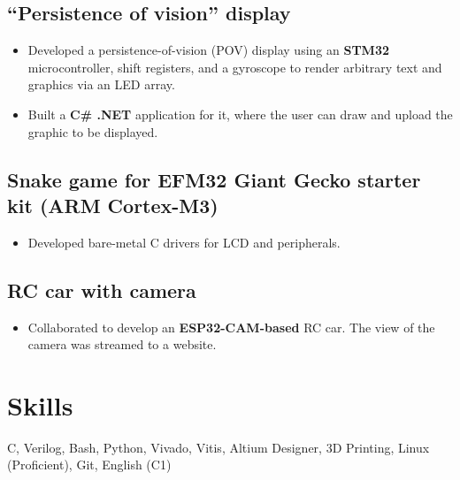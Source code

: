 \documentclass{article}
\begin{document}
\subsection{\enquote{Persistence of vision} display}
\begin{itemize}
  \item Developed a persistence-of-vision (POV) display using an \textbf{STM32} microcontroller, shift registers, and a gyroscope to render arbitrary text and graphics via an LED array.
  \item Built a \textbf{C\# .NET} application for it, where the user can draw and upload the graphic to be displayed.
\end{itemize}

\subsection{Snake game for EFM32 Giant Gecko starter kit (ARM Cortex-M3)}
\begin{itemize}
  \item Developed bare-metal C drivers for LCD and peripherals.
\end{itemize}

\subsection{RC car with camera}
\begin{itemize}
  \item Collaborated to develop an \textbf{ESP32-CAM-based} RC car. The view of the camera was streamed to a website.


\end{itemize}

\section{\faCogs\enspace Skills}
\begin{description}
  \item C, Verilog, Bash, Python, Vivado, Vitis, Altium Designer, 3D Printing, Linux (Proficient), Git, English (C1)
\end{description}
\end{document}
